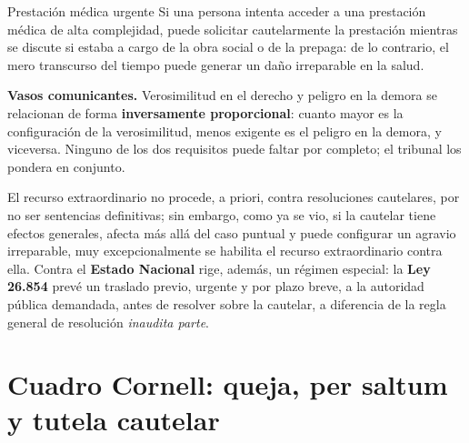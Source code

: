 \documentclass[12pt,oneside]{book}
\begin{document}
\begin{example}{Prestación médica urgente}
Si una persona intenta acceder a una prestación médica de alta complejidad, puede solicitar cautelarmente la prestación mientras se discute si estaba a cargo de la obra social o de la prepaga: de lo contrario, el mero transcurso del tiempo puede generar un daño irreparable en la salud.
\end{example}

\begin{important}
\textbf{Vasos comunicantes.} Verosimilitud en el derecho y peligro en la demora se relacionan de forma \textbf{inversamente proporcional}: cuanto mayor es la configuración de la verosimilitud, menos exigente es el peligro en la demora, y viceversa. Ninguno de los dos requisitos puede faltar por completo; el tribunal los pondera en conjunto.
\end{important}

El recurso extraordinario no procede, a priori, contra resoluciones cautelares, por no ser sentencias definitivas; sin embargo, como ya se vio, si la cautelar tiene efectos generales, afecta más allá del caso puntual y puede configurar un agravio irreparable, muy excepcionalmente se habilita el recurso extraordinario contra ella. Contra el \textbf{Estado Nacional} rige, además, un régimen especial: la \textbf{Ley 26.854} prevé un traslado previo, urgente y por plazo breve, a la autoridad pública demandada, antes de resolver sobre la cautelar, a diferencia de la regla general de resolución \textit{inaudita parte}.

\section{Cuadro Cornell: queja, per saltum y tutela cautelar}
\end{document}

